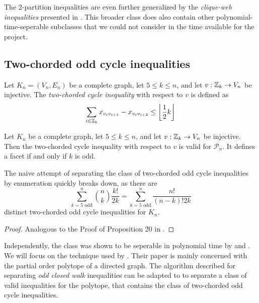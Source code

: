 The 2-partition inequalities are even further generalized by the \textit{clique-web inequalities} presented in \cite{dezaCliqueWebFacetsMulticut1992}.
This broader class does also contain other polynomial-time-seperable subclasses that we could not consider in the time available for the project.

\subsection{Two-chorded odd cycle inequalities}\label{subsec:two_chorded_separator}
\begin{definition}\label{def:2-chorded_cycle_inequality}
	Let $K_{n} = (V_{n}, E_{n})$ be a complete graph, let $5 \leq k \leq n$, and let $v: \mathbb{Z}_{k} \to V_{n}$ be injective.
	The \textit{two-chorded cycle inequality} with respect to $v$ is defined as
	\begin{equation}\label{eq:two-chorded_cycle_inequality}
		\sum_{i \in \mathbb{Z}_{k}}^{} x_{v_{i}v_{i+1}} - x_{v_{i}v_{i+2}} \leq \left\lfloor \frac{1}{2} k \right\rfloor
	\end{equation}
\end{definition}
\begin{theorem}
	Let $K_{n}$ be a complete graph, let $5 \leq k \leq n$, and let $v: \mathbb{Z}_{k} \to V_{n}$ be injective.
	Then the two-chorded cycle inequality with respect to $v$ is valid for $\mathscr{P}_{n}$.
	It defines a facet if and only if $k$ is odd.
\end{theorem}

The naive attempt of separating the class of two-chorded odd cycle inequalities by enumeration quickly breaks down,
as there are 
\[
	\sum_{k=5 \text{ odd}}^{n} \binom{n}{k} \frac{k!}{2k} = \sum_{k = 5 \text{ odd}}^{n} \frac{n!}{(n-k)!2k}
\]
distinct two-chorded odd cycle inequalities for $K_{n}$.
\begin{proof}
	Analogous to the Proof of Proposition 20 in \cite{andresPolyhedralStudyLifted2022}.
\end{proof}

Independently, the class was shown to be seperable in polynomial time by \cite{mullerPartialOrderPolytope1996} and \cite{capraraChvatalGomoryCuts1996}.
We will focus on the technique used by \cite{mullerPartialOrderPolytope1996}.
Their paper is mainly concerned with the partial order polytope of a directed graph.
The algorithm described for separating \textit{odd closed walk} inequalities can be adapted to to separate a class of valid inequalities for the \CP polytope, that contains the class of two-chorded odd cycle inequalities.

